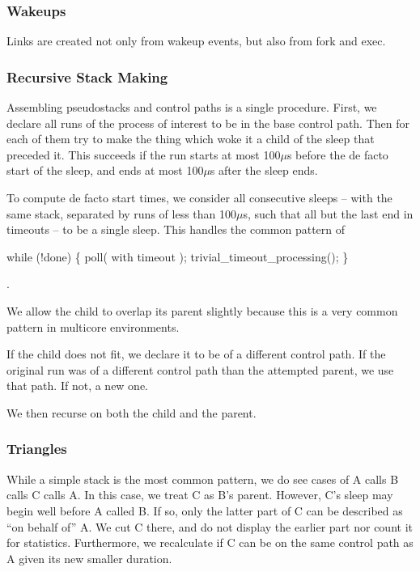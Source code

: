 \documentclass[10pt]{article}
\begin{document}
\subsubsection{Wakeups}

Links are created not only from wakeup events, but also from fork and exec.

\subsubsection{Recursive Stack Making}

Assembling pseudostacks and control paths is a single procedure.  First, we declare all runs of the process of interest to be in the base control path.  Then for each of them try to make the thing which woke it a child of the sleep that preceded it.  This succeeds if the run starts at most 100$\mu$s before the de facto start of the sleep, and ends at most 100$\mu$s after the sleep ends.  

To compute de facto start times, we consider all consecutive sleeps -- with the same stack, separated by runs of less than 100$\mu$s, such that all but the last end in timeouts -- to be a single sleep.  This handles the common pattern of \begin{tt}while (!done) \{ poll( with timeout ); trivial\_timeout\_processing(); \}\end{tt}.

We allow the child to overlap its parent slightly because this is a very common pattern in multicore environments.

If the child does not fit, we declare it to be of a different control path.  If the original run was of a different control path than the attempted parent, we use that path.  If not, a new one.

We then recurse on both the child and the parent. 

\subsubsection{Triangles}

While a simple stack is the most common pattern, we do see cases of A calls B calls C calls A.  In this case, we treat C as B's parent.  However, C's sleep may begin well before A called B.  If so, only the latter part of C can be described as ``on behalf of'' A.  We cut C there, and do not display the earlier part nor count it for statistics.  Furthermore, we recalculate if C can be on the same control path as A given its new smaller duration.
\end{document}
